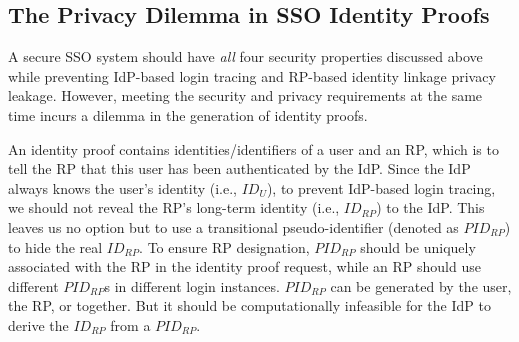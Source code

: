 \subsection{The Privacy Dilemma in SSO Identity Proofs}
\label{subsec:challenges}

A secure SSO system should have {\em all} four security properties discussed above while preventing IdP-based login tracing and RP-based identity linkage privacy leakage. However, meeting the security and privacy requirements at the same time incurs a dilemma in the generation of identity proofs.

An identity proof contains identities/identifiers of a user and an RP, which is to tell the RP that this user has been authenticated by the IdP.
Since the IdP always knows the user's identity (i.e., $ID_U$), to prevent IdP-based login tracing, we should not reveal the RP's long-term identity (i.e., $ID_{RP}$) to the IdP. This leaves us no option but to use a transitional pseudo-identifier (denoted as $PID_{RP}$) to hide the real $ID_{RP}$. To ensure RP designation, $PID_{RP}$ should be uniquely associated with the RP in the identity proof request, while an RP should use different $PID_{RP}$s in different login instances. $PID_{RP}$ can be generated by the user, the RP, or together. But it should be computationally infeasible for the IdP to derive the $ID_{RP}$ from a $PID_{RP}$.

